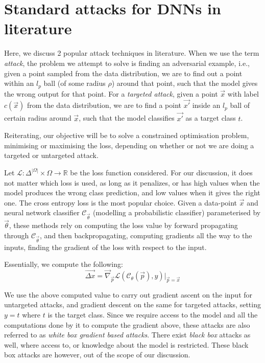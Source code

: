 \documentclass{ociamthesis}
\begin{document}
\section{Standard attacks for DNNs in literature}
\label{section:standard-attacks}

Here, we discuss 2 popular attack techniques in literature. When we use the term
\emph{attack}, the problem we attempt to solve is finding an adversarial
example, i.e., given a point sampled from the data distribution, we are to find
out a point within an $l_p$ ball (of some radius $\rho$) around that point, such
that the model gives the wrong output for that point. For a \emph{targeted
attack}, given a point $\vec{x}$ with label $c(\vec{x})$ from the data
distribution, we are to find a point $\vec{x'}$ inside an $l_p$ ball of certain
radius around $\vec{x}$, such that the model classifies $\vec{x'}$ as a target
class $t$.

Reiterating, our objective will be to solve a constrained optimisation problem,
minimising or maximising the loss, depending on whether or not we are doing a
targeted or untargeted attack.

Let $\mathcal{L}: \Delta^{|\Omega|} \times \Omega \to \mathbb{R}$ be the loss
function considered. For our discussion, it does not matter which loss is used,
as long as it penalizes, or has high values when the model produces the wrong
class prediction, and low values when it gives the right one. The cross entropy
loss is the most popular choice. Given a data-point $\vec{x}$ and neural network
classifier $\mathcal{C}_\vec{\theta}$ (modelling a probabilistic classifier)
parameterised by $\vec{\theta}$, these methods rely on computing the loss value
by forward propagating through $\mathcal{C}_\vec{\theta}$, and then
backpropagating, computing gradients all the way to the inputs, finding the
gradient of the loss with respect to the input.

Essentially, we compute the following:
\begin{equation*}
    \vec{\Delta x}
    = \vec{\nabla}_\vec{p} \mathcal{L}(\mathcal{C}_\theta (\vec{p}), y)
    \bigr \rvert_{\vec{p}=\vec{x}}
\end{equation*}

We use the above computed value to carry out gradient ascent on the input for
untargeted attacks, and gradient descent on the same for targeted attacks,
setting $y=t$ where $t$ is the target class. Since we require access to the
model and all the computations done by it to compute the gradient above, these
attacks are also referred to as \emph{white box gradient based attacks}. There
exist \emph{black box} \citep{simba,genattack,prior-conv} attacks as well, where
access to, or knowledge about the model is restricted. These black box attacks
are however, out of the scope of our discussion.
\end{document}
